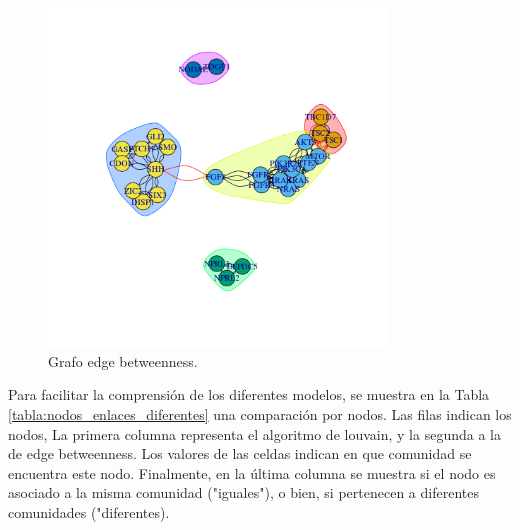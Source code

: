 \begin{figure}[!]
  \centering
  \includegraphics[width=0.8\textwidth]{figures/grafo_alternativo_comunidades.png}
  \caption{Grafo edge betweenness.}
  \label{fig:Grafo_between}
\end{figure}

Para facilitar la comprensión de los diferentes modelos, se muestra en la Tabla \ref{tabla:nodos_enlaces_diferentes} una comparación por nodos. Las filas indican los nodos, La primera columna representa el algoritmo de louvain, y la segunda a la de edge betweenness. Los valores de las celdas indican en que comunidad se encuentra este nodo. Finalmente, en la última columna se muestra si el nodo es asociado a la misma comunidad ("iguales"), o bien, si pertenecen a diferentes comunidades ("diferentes).

